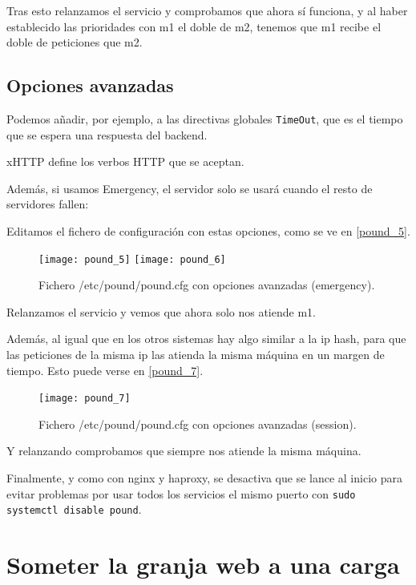 Tras esto relanzamos el servicio y comprobamos que ahora sí funciona, y al haber establecido las prioridades con m1 el doble de m2, tenemos que m1 recibe el doble de peticiones que m2.

\section{Opciones avanzadas}

Podemos añadir, por ejemplo, a las directivas globales \verb|TimeOut|, que es el tiempo que se espera una respuesta del backend.

xHTTP define los verbos HTTP que se aceptan.

Además, si usamos Emergency, el servidor solo se usará cuando el resto de servidores fallen:

Editamos el fichero de configuración con estas opciones, como se ve en \eqref{pound_5}.

\begin{figure}[h!]
\begin{center}
\caption{Fichero /etc/pound/pound.cfg con opciones avanzadas (emergency).}
\label{pound_5}
\texttt{[image: pound\_5]}
\texttt{[image: pound\_6]}
\end{center}
\end{figure}

Relanzamos el servicio y vemos que ahora solo nos atiende m1.

Además, al igual que en los otros sistemas hay algo similar a la ip hash, para que las peticiones de la misma ip las atienda la misma máquina en un margen de tiempo. Esto puede verse en \eqref{pound_7}.

\begin{figure}[h!]
\begin{center}
\caption{Fichero /etc/pound/pound.cfg con opciones avanzadas (session).}
\label{pound_7}
\texttt{[image: pound\_7]}
\end{center}
\end{figure}

Y relanzando comprobamos que siempre nos atiende la misma máquina.

Finalmente, y como con nginx y haproxy, se desactiva que se lance al inicio para evitar problemas por usar todos los servicios el mismo puerto con \verb|sudo systemctl disable pound|.

\chapter{Someter la granja web a una carga}

